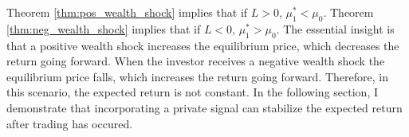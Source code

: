 \documentclass[12pt]{article}
\begin{document}
Theorem \ref{thm:pos_wealth_shock} implies that if $L>0$, $\mu_1^* < \mu_0$. Theorem \ref{thm:neg_wealth_shock} implies that if $L<0$, $\mu_1^* > \mu_0$. The essential insight is that a positive wealth shock increases the equilibrium price, which decreases the return going forward. When the investor receives a negative wealth shock the equilibrium price falls, which increases the return going forward. Therefore, in this scenario, the expected return is not constant. In the following section, I demonstrate that incorporating a private signal can stabilize the expected return after trading has occured.
\end{document}
